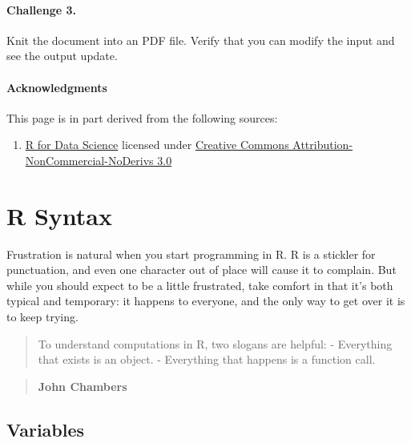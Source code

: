 \documentclass[]{book}
\providecommand{\tightlist}{%
  \setlength{\itemsep}{0pt}\setlength{\parskip}{0pt}}
\begin{document}
\hypertarget{challenge-3.}{%
\subsubsection*{Challenge 3.}\label{challenge-3.}}

Knit the document into an PDF file. Verify that you can modify the input and see the output update.

\hypertarget{acknowledgments-2}{%
\subsubsection*{Acknowledgments}\label{acknowledgments-2}}

This page is in part derived from the following sources:

\begin{enumerate}
\def\labelenumi{\arabic{enumi}.}
\tightlist
\item
  \href{https://r4ds.had.co.nz}{R for Data Science} licensed under \href{https://creativecommons.org/licenses/by-nc-nd/3.0/us/}{Creative Commons Attribution-NonCommercial-NoDerivs 3.0}
\end{enumerate}

\hypertarget{r-syntax}{%
\chapter{R Syntax}\label{r-syntax}}

Frustration is natural when you start programming in R. R is a stickler for punctuation, and even one character out of place will cause it to complain. But while you should expect to be a little frustrated, take comfort in that it's both typical and temporary: it happens to everyone, and the only way to get over it is to keep trying.

\begin{quote}
To understand computations in R, two slogans are helpful:
- Everything that exists is an object.
- Everything that happens is a function call.
\end{quote}

\begin{quote}
\textbf{John Chambers}
\end{quote}

\hypertarget{variables}{%
\section{Variables}\label{variables}}
\end{document}
